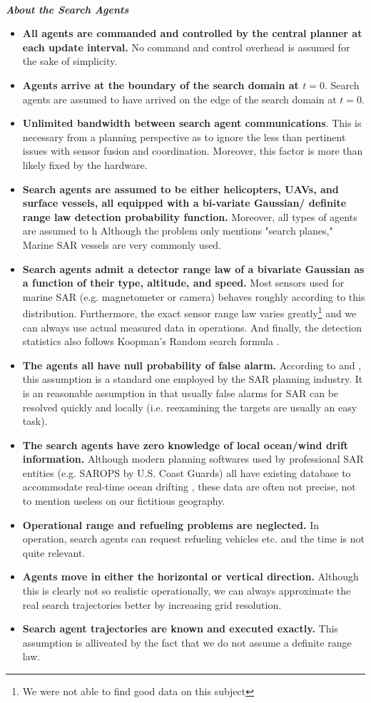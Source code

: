\documentclass[12pt, letterpaper]{article}  %
\theoremstyle{definition}
\theoremstyle{remark}
\theoremstyle{plain}
\begin{document}
\ \\
\textit{\textbf{About the Search Agents}}
\begin{itemize}
\item \textbf{All agents are commanded and controlled by the central planner at each update interval.} No command and control overhead is assumed for the sake of simplicity.
\item \textbf{Agents arrive at the boundary of the search domain at $t=0$}.  Search agents are assumed to have arrived on the edge of the search domain at $t=0$.
\item \textbf{Unlimited bandwidth between search agent communications}.  This is necessary from a planning perspective as to ignore the less than pertinent issues with sensor fusion and coordination. Moreover, this factor is more than likely fixed by the hardware.
\item \textbf{Search agents are assumed to be either helicopters, UAVs, and surface vessels, all equipped with a bi-variate Gaussian/ definite range law detection probability function.} Moreover, all types of agents are assumed to h Although the problem only mentions "search planes," Marine SAR vessels are very commonly used.
\item \textbf{Search agents admit a detector range law of a bivariate Gaussian as a function of their type, altitude, and speed.} Most sensors used for marine SAR (e.g. magnetometer or camera) behaves roughly according to this distribution. Furthermore, the exact sensor range law varies greatly\footnote{We were not able to find good data on this subject} and we can always use actual measured data in operations. And finally, the detection statistics also follows Koopman's Random search formula \cite{46koopman}.
\item \textbf{The agents all have null probability of false alarm.} According to \cite{83stone} and \cite{13kagan}, this assumption is a standard one employed by the SAR planning industry. It is an reasonable assumption in that usually false alarms for SAR can be resolved quickly and locally (i.e. reexamining the targets are usually an easy task).
\item \textbf{The search agents have zero knowledge of local ocean/wind drift information.} Although modern planning softwares used by professional SAR entities (e.g. SAROPS by U.S. Coast Guards) all have existing database to accommodate real-time ocean drifting \cite{10uscg}, these data are often not precise, not to mention useless on our fictitious geography.
\item \textbf{Operational range and refueling problems are neglected.} In operation, search agents can request refueling vehicles etc. and the time is not quite relevant.
\item \textbf{Agents move in either the horizontal or vertical direction.} Although this is clearly not so realistic operationally, we can always approximate the real search trajectories better by increasing grid resolution.
\item \textbf{Search agent trajectories are known and executed exactly.} This assumption is alliveated by the fact that we do not assume a definite range law.


\end{itemize}
\end{document}
